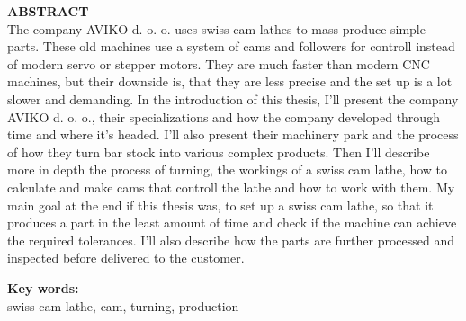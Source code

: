 \newpage
\textbf{\fontsize{14}{21}\selectfont ABSTRACT} \\
The company AVIKO d. o. o. uses swiss cam lathes to mass produce
simple parts. These old machines use a system of cams and followers
for controll instead of modern servo or stepper motors. They are
much faster than modern CNC machines, but their downside is, 
that they are less precise and the set up is a lot slower and demanding.
In the introduction of this thesis, I'll present the company 
AVIKO d. o. o., their specializations and how the company developed
through time and where it's headed. I'll also present their 
machinery park and the process of how they turn bar stock into 
various complex products. Then I'll describe more in depth the
process of turning, the workings of a swiss cam lathe, how to 
calculate and make cams that controll the lathe and how to work
with them. My main goal at the end if this thesis was, to set up
a swiss cam lathe, so that it produces a part in the least amount 
of time and check if the machine can achieve the required
tolerances. I'll also describe how the parts are further processed
and inspected before delivered to the customer.

\textbf{\fontsize{14}{21}\selectfont Key words:} \\
\fontsize{12}{16}swiss cam lathe, cam, turning, production